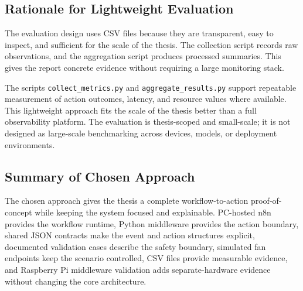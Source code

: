 \subsection{Rationale for Lightweight Evaluation}\label{subsec:rationale-lightweight-evaluation}

The evaluation design uses CSV files because they are transparent, easy to inspect, and sufficient for the scale of the thesis. The collection script records raw observations, and the aggregation script produces processed summaries. This gives the report concrete evidence without requiring a large monitoring stack.

The scripts \texttt{collect\_metrics.py} and \texttt{aggregate\_results.py} support repeatable measurement of action outcomes, latency, and resource values where available. This lightweight approach fits the scale of the thesis better than a full observability platform. The evaluation is thesis-scoped and small-scale; it is not designed as large-scale benchmarking across devices, models, or deployment environments.

\subsection{Summary of Chosen Approach}\label{subsec:chosen-approach-summary}

The chosen approach gives the thesis a complete workflow-to-action proof-of-concept while keeping the system focused and explainable. PC-hosted n8n provides the workflow runtime, Python middleware provides the action boundary, shared JSON contracts make the event and action structures explicit, documented validation cases describe the safety boundary, simulated fan endpoints keep the scenario controlled, CSV files provide measurable evidence, and Raspberry Pi middleware validation adds separate-hardware evidence without changing the core architecture.
